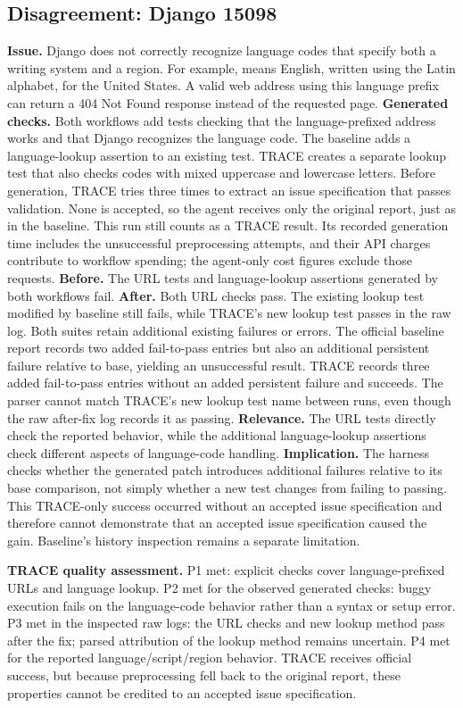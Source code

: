 \subsection{Disagreement: Django 15098}
\textbf{Issue.} Django does not correctly recognize language codes that specify both a writing system and a region. For example,  means English, written using the Latin alphabet, for the United States. A valid web address using this language prefix can return a 404 Not Found response instead of the requested page. \textbf{Generated checks.} Both workflows add tests checking that the language-prefixed address works and that Django recognizes the language code. The baseline adds a language-lookup assertion to an existing test. TRACE creates a separate lookup test that also checks codes with mixed uppercase and lowercase letters. Before generation, TRACE tries three times to extract an issue specification that passes validation. None is accepted, so the agent receives only the original report, just as in the baseline. This run still counts as a TRACE result. Its recorded generation time includes the unsuccessful preprocessing attempts, and their API charges contribute to workflow spending; the agent-only cost figures exclude those requests.
\textbf{Before.} The URL tests and language-lookup assertions generated by both workflows fail. \textbf{After.} Both URL checks pass. The existing lookup test modified by baseline still fails, while TRACE's new lookup test passes in the raw log. Both suites retain additional existing failures or errors. The official baseline report records two added fail-to-pass entries but also an additional persistent failure relative to base, yielding an unsuccessful result. TRACE records three added fail-to-pass entries without an added persistent failure and succeeds. The parser cannot match TRACE's new lookup test name between runs, even though the raw after-fix log records it as passing.
\textbf{Relevance.} The URL tests directly check the reported behavior, while the additional language-lookup assertions check different aspects of language-code handling. \textbf{Implication.} The harness checks whether the generated patch introduces additional failures relative to its base comparison, not simply whether a new test changes from failing to passing. This TRACE-only success occurred without an accepted issue specification and therefore cannot demonstrate that an accepted issue specification caused the gain. Baseline's history inspection remains a separate limitation.

\textbf{TRACE quality assessment.} P1 met: explicit checks cover language-prefixed URLs and language lookup. P2 met for the observed generated checks: buggy execution fails on the language-code behavior rather than a syntax or setup error. P3 met in the inspected raw logs: the URL checks and new lookup method pass after the fix; parsed attribution of the lookup method remains uncertain. P4 met for the reported language/script/region behavior. TRACE receives official success, but because preprocessing fell back to the original report, these properties cannot be credited to an accepted issue specification.

